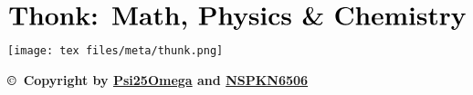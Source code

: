\documentclass{article}
\begin{document}
\begin{align*}
    \textbf{\huge{Thonk: Math, Physics \& Chemistry}}\\
\end{align*}
\thispagestyle{empty}
\begin{center}
    \texttt{[image: tex files/meta/thunk.png]}
\end{center}
\vspace*{\fill}
\begin{center}
    \textbf{\copyright~Copyright by \href{https://github.com/Psi25Omega}{Psi25Omega} and \href{https://github.com/NSPKN6506}{NSPKN6506}}\\
\end{center}
\newpage
\tableofcontents
\thispagestyle{empty}
\newpage


\end{document}
